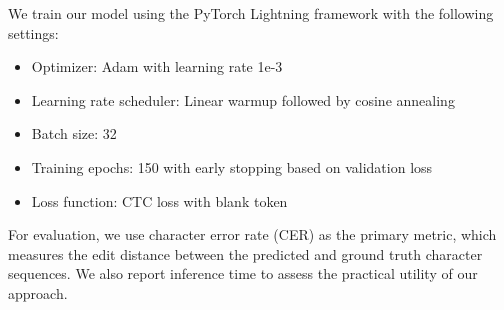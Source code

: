 We train our model using the PyTorch Lightning framework with the following settings:
\begin{itemize}
    \item Optimizer: Adam with learning rate 1e-3
    \item Learning rate scheduler: Linear warmup followed by cosine annealing
    \item Batch size: 32
    \item Training epochs: 150 with early stopping based on validation loss
    \item Loss function: CTC loss with blank token
\end{itemize}

For evaluation, we use character error rate (CER) as the primary metric, which measures the edit distance between the predicted and ground truth character sequences. We also report inference time to assess the practical utility of our approach.